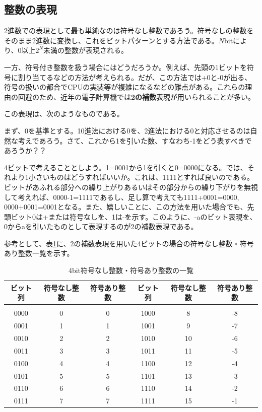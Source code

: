 \subsection{整数の表現}
2進数での表現として最も単純なのは符号なし整数であろう。符号なしの整数をそのまま2進数に変換し、これをビットパターンとする方法である。$N$bitにより、0以上$2^{N}$未満の整数が表現される。

一方、符号付き整数を扱う場合にはどうだろうか。例えば、先頭の1ビットを符号に割り当てるなどの方法が考えられる。だが、この方法では+0と-0が出る、符号の扱いの都合でCPUの実装等が複雑になるなどの難点がある。これらの理由の回避のため、近年の電子計算機では\textbf{2の補数}表現が用いられることが多い。

この表現は、次のようなものである。

まず、0を基準とする。10進法における0を、2進法における0と対応させるのは自然な考えであろう。さて、これから1を引いた数、すなわち-1をどう表すべきであろうか？？

4ビットで考えることとしよう。1=0001から1を引くと0=0000になる。では、それより1小さいものはどうすればいいか。これは、1111とすれば良いのである。ビットがあふれる部分への繰り上がりあるいはその部分からの繰り下がりを無視して考えれば、0000-1=1111であるし、足し算で考えても1111+0001=0000, 0000+0001=0001となる。また、嬉しいことに、この方法を用いた場合でも、先頭ビット0は+または符号なしを、1は-を示す。このように、-aのビット表現を、0からaを引いたものとして表現するのが2の補数表現である。

参考として、表\ref{table1_1}に、2の補数表現を用いた4ビットの場合の符号なし整数・符号あり整数一覧を示す。
\begin{table}[htb]
\centering
\caption{4bit符号なし整数・符号あり整数の一覧}\label{table1_1}
\begin{tabular}{|c|c|c||c|c|c|}\hline
ビット列&符号なし整数&符号あり整数&ビット列&符号なし整数&符号あり整数\\ \hline
&&&&&\\[-16pt]\hline
0000&0&0&1000&8&-8\\ \hline
0001&1&1&1001&9&-7\\ \hline
0010&2&2&1010&10&-6\\ \hline
0011&3&3&1011&11&-5\\ \hline
0100&4&4&1100&12&-4\\ \hline
0101&5&5&1101&13&-3\\ \hline
0110&6&6&1110&14&-2\\ \hline
0111&7&7&1111&15&-1\\ \hline
\end{tabular}
\end{table}

